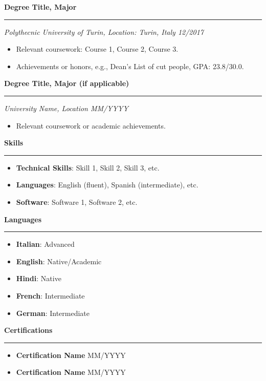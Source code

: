 \documentclass[a4paper,10pt]{article}
\renewcommand{\section}[1]{\vspace{0.1in} \noindent \textbf{\LARGE \textcolor{myblue}{#1}} \vspace{0.05in} \hrule \vspace{0.05in}}
\renewcommand{\subsection}[1]{\vspace{0.1in} \noindent \textbf{\large \textcolor{myblue}{#1}} \vspace{0.05in} \hrule \vspace{0.05in}}
\begin{document}
\subsection{Degree Title, Major}
\textit{Polythecnic University of Turin, Location: Turin, Italy \hfill 12/2017}
\begin{itemize}[left=0pt]
    \item Relevant coursework: Course 1, Course 2, Course 3.
    \item Achievements or honors, e.g., Dean's List of cut people, GPA: 23.8/30.0.
\end{itemize}

\subsection{Degree Title, Major (if applicable)}
\textit{University Name, Location \hfill MM/YYYY}
\begin{itemize}[left=0pt]
    \item Relevant coursework or academic achievements.
\end{itemize}

\section{Skills}
\begin{itemize}[left=0pt]
    \item \textbf{Technical Skills}: Skill 1, Skill 2, Skill 3, etc.
    \item \textbf{Languages}: English (fluent), Spanish (intermediate), etc.
    \item \textbf{Software}: Software 1, Software 2, etc.
\end{itemize}

\section{Languages}
\begin{itemize}[left=0pt]
    \item \textbf{Italian}: Advanced
    \item \textbf{English}: Native/Academic
    \item \textbf{Hindi}: Native
    \item \textbf{French}: Intermediate
    \item \textbf{German}: Intermediate
\end{itemize}

\section{Certifications}
\begin{itemize}[left=0pt]
    \item \textbf{Certification Name} \hfill MM/YYYY
    \item \textbf{Certification Name} \hfill MM/YYYY
\end{itemize}
\end{document}
